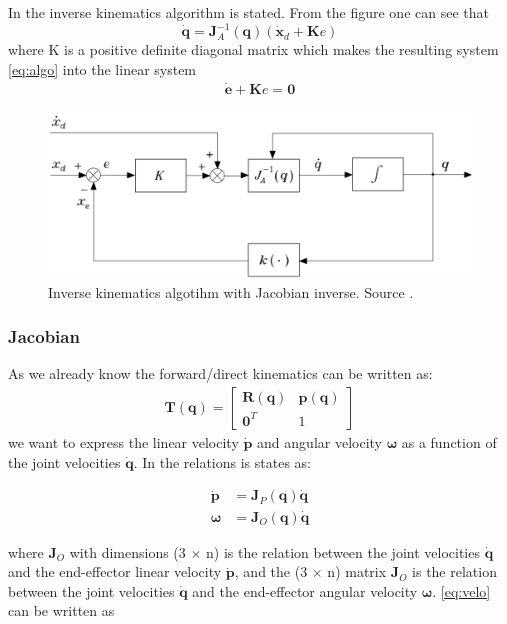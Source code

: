 In  the inverse kinematics algorithm is stated. From the figure one can see that 
$$
\dot{\bm{q}} = \bm{J}_A^{-1}(\bm{q})(\dot{\bm{x}}_d + \bm{K}e)
$$
where K is a positive definite diagonal matrix which makes the resulting system \eqref{eq:algo} into the linear system
\begin{align*}
    \dot{\bm{e}} + \bm{K}e = \bm{0}
\end{align*}


\begin{figure}[htbp]
  \centering
  \includegraphics[width=.9\textwidth]{img/inverseKin.png}
  \caption{Inverse kinematics algotihm with Jacobian inverse. Source \cite{Siciliano}.}
  \label{fig:inverseAlgo}
\end{figure}


\subsubsection*{Jacobian}
As we already know the forward/direct kinematics can be written as:
\begin{align*}
    \bm{T}(\bm{q}) = 
    \begin{bmatrix}
        \bm{R}(\bm{q}) & \bm{p}(\bm{q})\\
        \bm{0}^T & 1
    \end{bmatrix}
\end{align*}
we want to express the linear velocity $\dot{\bm{p}}$ and angular velocity $\bm{\omega}$ as a function of the joint velocities $\dot{\bm{q}}$. In \cite{Siciliano} the relations is states as:

\begin{equation}
    \begin{aligned}\label{eq:velo}
        \dot{\bm{p}} &= \bm{J}_P(\bm{q})\dot{\bm{q}}\\
        \bm{\omega} &= \bm{J}_O(\bm{q})\dot{\bm{q}}
    \end{aligned}
\end{equation}

where $\bm{J}_O$ with dimensions (3 $\times$ n) is the relation between the joint velocities $\dot{\bm{q}}$ and the end-effector linear velocity $\dot{\bm{p}}$, and the (3 $\times$ n) matrix $\bm{J}_O$ is the relation between the joint velocities $\dot{\bm{q}}$ and the end-effector angular velocity $\bm{\omega}$. \eqref{eq:velo} can be written as

